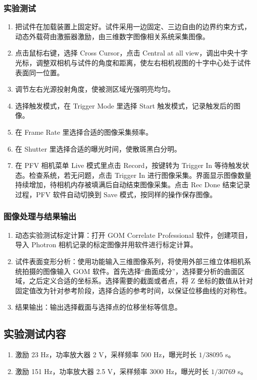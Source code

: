 \documentclass[UTF8,a4paper,12pt]{ctexart}
\numberwithin{equation}{section}
\begin{document}
\subsubsection{实验测试}
\begin{enumerate}[label=\alph*)]
  \item 把试件在加载装置上固定好。试件采用一边固定、三边自由的边界约束方式，动态外载荷由激振器激励，由三维数字图像相关系统采集图像。
  \item 点击鼠标右键，选择 Cross Cursor，点击 Central at all view，调出中央十字光标，调整双相机与试件的角度和距离，使左右相机视图的十字中心处于试件表面同一位置。
  \item 调节左右光源投射角度，使被测区域光强明亮均匀。
  \item 选择触发模式，在 Trigger Mode 里选择 Start 触发模式，记录触发后的图像。
  \item 在 Frame Rate 里选择合适的图像采集频率。
  \item 在 Shutter 里选择合适的曝光时间，使散斑黑白分明。
  \item 在 PFV 相机菜单 Live 模式里点击 Record，按键转为 Trigger In 等待触发状态。检查系统，若无问题，点击 Trigger In 进行图像采集。界面显示图像数量持续增加，待相机内存被填满后自动结束图像采集。点击 Rec Done 结束记录过程，PFV 软件自动切换到 Save 模式，按同样的操作保存图像。
\end{enumerate}

\subsubsection{图像处理与结果输出}
\begin{enumerate}[label=\alph*)]
  \item 动态实验测试标定计算：打开 GOM Correlate Professional 软件，创建项目，导入 Photron 相机记录的标定图像并用软件进行标定计算。
  \item 试件表面变形分析：使用功能输入三维图像系列，将使用外部三维立体相机系统拍摄的图像输入 GOM 软件。首先选择“曲面成分”，选择要分析的曲面区域，之后定义合适的坐标系。选择需要的截面或者点，将 Z 坐标的数值从针对固定值改为针对参考阶段，选择合适的参考时间，以保证位移曲线的对称性。
  \item 结果输出：输出选择截面与选择点的位移坐标等信息。
\end{enumerate}

\subsection{实验测试内容}
\begin{enumerate}
  \item 激励 23 Hz，功率放大器 2 V，采样频率 500 Hz，曝光时长 $1/38095$ s。
  \item 激励 151 Hz，功率放大器 2.5 V，采样频率 3000 Hz，曝光时长 $1/30769$ s。
\end{enumerate}
\end{document}
